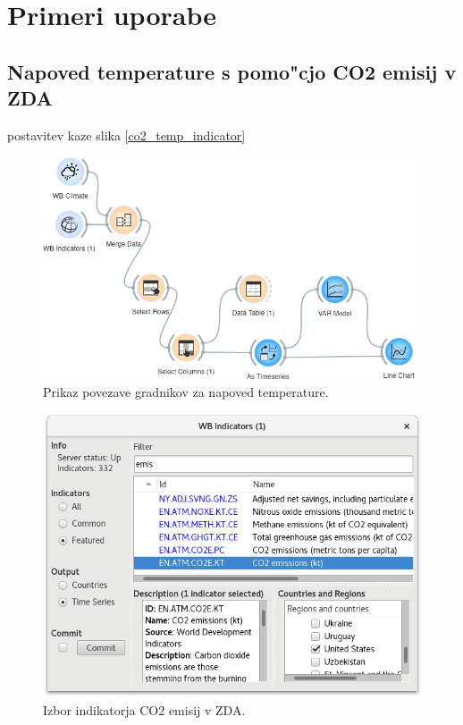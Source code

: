 \chapter{Primeri uporabe}



\section{Napoved temperature s pomo"cjo CO2 emisij v ZDA}



postavitev kaze slika \ref{co2_temp_indicator}

\begin{figure}
\begin{center}
\includegraphics[width=11cm]{pic/var_setup.png}
\end{center}
\caption{Prikaz povezave gradnikov za napoved temperature.}
\label{co2_temp_forecast}
\end{figure} 


\begin{figure}
\begin{center}
\includegraphics[width=12cm]{pic/var_indicator_select.png}
\end{center}
\caption{Izbor indikatorja CO2 emisij v ZDA.}
\label{co2_temp_setup}
\end{figure} 

